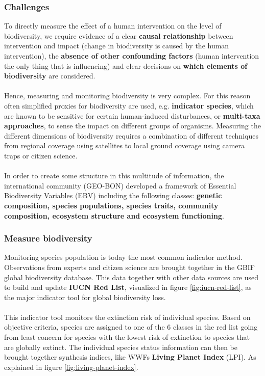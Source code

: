 \documentclass[../summary.tex]{subfiles}
\begin{document}
	\subsubsection{Challenges}
	To directly measure the effect of a human intervention on the level of biodiversity, we require evidence of a clear \textbf{causal relationship} between intervention and impact (change in biodiversity is caused by the human intervention), the \textbf{absence of other confounding factors} (human intervention the only thing that is influencing) and clear decisions on \textbf{which elements of biodiversity} are considered. 
	\\
	\\
	Hence, measuring and monitoring biodiversity is very complex. For this reason often simplified proxies for biodiversity are used, e.g. \textbf{indicator species}, which are known to be sensitive for certain human-induced disturbances, or \textbf{multi-taxa approaches}, to sense the impact on different groups of organisms. Measuring the different dimensions of biodiversity requires a combination of different techniques from regional coverage using satellites to local ground coverage using camera traps or citizen science. 
	\\
	\\
	In order to create some structure in this multitude of information, the international community (GEO-BON) developed a framework of Essential Biodiversity Variables (EBV) including the following classes: \textbf{genetic composition, species populations,  species traits, community composition, ecosystem structure and ecosystem functioning}.
	
	\subsubsection{Measure biodiversity}
	Monitoring species population is today the most common indicator method. Observations from experts and citizen science are brought together in the GBIF global biodiversity database. This data together with other data sources are used to build and update \textbf{IUCN Red List}, visualized in figure \ref{fig:iucn-red-list}, as the major indicator tool for global biodiversity loss.
	\\
	\\
	This indicator tool monitors the extinction risk of individual species. Based on objective criteria, species are assigned to one of the 6 classes in the red list going from least concern for species with the lowest risk of extinction to species that are globally extinct. The individual species status information can then be brought together synthesis indices, like WWFs \textbf{Living Planet Index} (LPI). As explained in figure \ref{fig:living-planet-index}.
	
\end{document}
